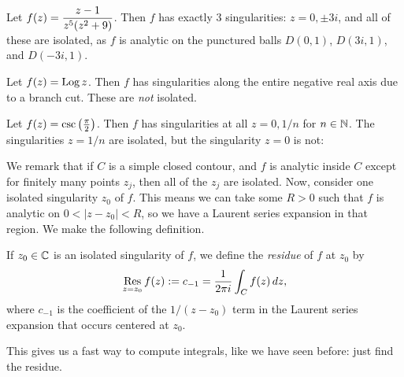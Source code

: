 \documentclass{article}
\begin{document}
\begin{example}
Let $f(z) = \displaystyle\frac{z-1}{z^5(z^2+9)}$. Then $f$ has exactly $3$ singularities: $z = 0, \pm 3i$, and all of these are isolated, as $f$ is analytic on the punctured balls $D(0, 1)$, $D(3i, 1)$, and $D(-3i, 1)$.
\end{example}
\begin{example}
Let $f(z) = \operatorname{Log} z$. Then $f$ has singularities along the entire negative real axis due to a branch cut. These are \textit{not} isolated.
\end{example}
\begin{example}
Let $f(z) = \csc\left(\frac \pi2 \right)$. Then $f$ has singularities at all $z = 0, 1/n$ for $n\in\mathbb N$. The singularities $z=1/n$ are isolated, but the singularity $z=0$ is not:
\begin{center}
\end{center}
\end{example}
We remark that if $C$ is a simple closed contour, and $f$ is analytic inside $C$ except for finitely many points $z_j$, then all of the $z_j$ are isolated. Now, consider one isolated singularity $z_0$ of $f$. This means we can take some $R>0$ such that $f$ is analytic on $0 < |z-z_0| < R$, so we have a Laurent series expansion in that region. We make the following definition.
\begin{definition}
If $z_0\in\mathbb C$ is an isolated singularity of $f$, we define the \textit{residue} of $f$ at $z_0$ by
$$\operatorname*{Res}_{z=z_0} f(z) := c_{-1} = \frac 1{2\pi i} \int_C f(z)\, dz,$$
where $c_{-1}$ is the coefficient of the $1/(z-z_0)$ term in the Laurent series expansion that occurs centered at $z_0$.
\end{definition}
This gives us a fast way to compute integrals, like we have seen before: just find the residue.
\setcounter{section}{92}
\end{document}
